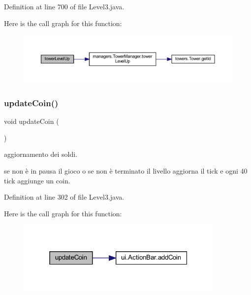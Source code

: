 Definition at line 700 of file Level3.\+java.

Here is the call graph for this function\+:\nopagebreak
\begin{figure}[H]
\begin{center}
\leavevmode
\includegraphics[width=350pt]{classscenes_1_1_level3_a8a3c715fcfd3d65e1d8241a1fa4965ff_cgraph}
\end{center}
\end{figure}
\mbox{\label{classscenes_1_1_level3_a7ca93fcd8c7440e7b3f64c595a5be28c}} 
\subsubsection{\texorpdfstring{update\+Coin()}{updateCoin()}}
{\footnotesize\ttfamily void update\+Coin (\begin{DoxyParamCaption}{ }\end{DoxyParamCaption})}



aggiornamento dei soldi. 

se non è in pausa il gioco o se non è terminato il livello aggiorna il tick e ogni 40 tick aggiunge un coin. 

Definition at line 302 of file Level3.\+java.

Here is the call graph for this function\+:\nopagebreak
\begin{figure}[H]
\begin{center}
\leavevmode
\includegraphics[width=289pt]{classscenes_1_1_level3_a7ca93fcd8c7440e7b3f64c595a5be28c_cgraph}
\end{center}
\end{figure}
\mbox{\label{classscenes_1_1_level3_af005ec68c869a6acd5e833cba9330a50}} 
